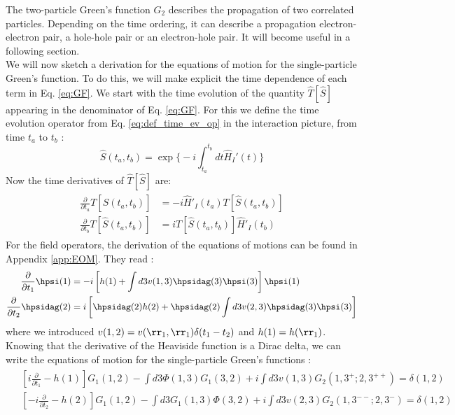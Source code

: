 The two-particle Green's function $G_2$ describes the propagation of two correlated particles. Depending on the time ordering, it can describe a propagation electron-electron pair, a hole-hole pair or an electron-hole pair. It will become useful in a following section. \\
%

We will now sketch a derivation for the equations of motion for the single-particle Green's function. To do this, we will make explicit the time dependence of each term in Eq. \eqref{eq:GF}.
We start with the time evolution of the quantity $\hat{T}[\hat{S}]$ appearing in the denominator of Eq. \eqref{eq:GF}.
For this we define the time evolution operator from Eq. \eqref{eq:def_time_ev_op} in the interaction picture, from time $t_a$ to $t_b$ :
\begin{equation}
	\hat{S}(t_a,t_b) = \exp	\biggl\{ -i \int_{t_a}^{t_b} dt \hat{H}_I'(t) \biggr\}
\end{equation}
Now the time derivatives of $\hat{T}[\hat{S}]$ are:
\begin{align}
\begin{split}
	\frac{\partial}{\partial t_a} T[\hat{S}(t_a,t_b)] &= -i \hat{H}'_I(t_a)T[\hat{S}(t_a,t_b)] \\
	\frac{\partial}{\partial t_b} T[\hat{S}(t_a,t_b)] &= i T[\hat{S}(t_a,t_b)]\hat{H}'_I(t_b)
\end{split}
\end{align}
For the field operators, the derivation of the equations of motions can be found in Appendix \ref{app:EOM}. They read :
\begin{align}
\begin{split}
	\frac{\partial}{\partial t_1} \hpsi(1) &= -i \left[ h(1) + \int d3 v(1,3) \hpsidag(3)\hpsi(3) \right] \hpsi(1) \\
	\frac{\partial}{\partial t_2} \hpsidag(2) &= i \left[ \hpsidag(2)h(2) + \hpsidag(2) \int d3 v(2,3) \hpsidag(3)\hpsi(3) \right]
\end{split}	
\end{align}
where we introduced $v(1,2) = v(\rr_1,\rr_1)\delta(t_1-t_2)$ and $h(1)=h(\rr_1)$. Knowing that the derivative of the Heaviside function is a Dirac delta, we can write the equations of motion for the single-particle Green's functions :
\begin{align}
\begin{split}
	&\left[ i\frac{\partial}{\partial t_1} - h(1) \right] G_1(1,2) - \int d3 \Phi(1,3)G_1(3,2) + i \int d3 v(1,3) G_2(1,3^+;2,3^{++}) = \delta(1,2) \\
	&\left[ -i\frac{\partial}{\partial t_2} - h(2) \right] G_1(1,2) - \int d3 G_1(1,3)\Phi(3,2) + i \int d3 v(2,3) G_2(1,3^{--};2,3^-) = \delta(1,2)
\end{split}
\end{align}
